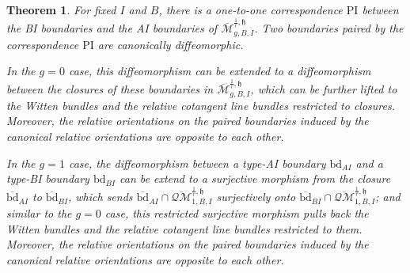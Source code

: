 \documentclass[11pt,a4paper]{article}
\newtheorem{thm}[dummy]{Theorem}
\theoremstyle{definition}
\theoremstyle{remark}
\newcommand{\oQMb}{{\overline{\mathcal{QM}}}}
\numberwithin{equation}{section}
\def\Mbar{{\overline{\mathcal M}}}
\def\PI{{\text{PI}}}
\def\h{{\mathfrak h}}
\begin{document}
 
 \begin{thm}\label{thm: PI boundaries paried}
 For fixed $I$ and $B$, there is a one-to-one correspondence $\PI$ between the BI boundaries and the AI boundaries of $\Mbar^{\frac{1}{r},\h}_{g,B,I}$. Two boundaries paired by the correspondence $\PI$ are canonically diffeomorphic. 
 
 In the $g=0$ case, this diffeomorphism can be extended to a diffeomorphism between the closures of these boundaries in $\Mbar^{\frac{1}{r},\h}_{g,B,I}$, which can be further lifted to the Witten bundles and the relative cotangent line bundles restricted to closures. Moreover, the relative orientations on the paired boundaries induced by the canonical relative orientations are opposite to each other. 
 
   
    In the $g=1$ case, the diffeomorphism between a type-AI boundary $\text{bd}_{AI}$ and a type-BI boundary $\text{bd}_{BI}$ can be extend to a surjective morphism from the closure $\overline{\text{bd}}_{AI}$ to $\overline{\text{bd}}_{BI}$, which sends  $\overline{\text{bd}}_{AI}\cap \oQMb^{\frac{1}{r},\h}_{1,B,I}$ surjectively onto $\overline{\text{bd}}_{BI}\cap \oQMb^{\frac{1}{r},\h}_{1,B,I}$; and similar to the $g=0$ case, this restricted surjective morphism pulls back the Witten bundles and the relative cotangent line bundles restricted to them. Moreover, the relative orientations on the paired boundaries induced by the canonical relative orientations are opposite to each other. 
   
 \end{thm}
\end{document}

